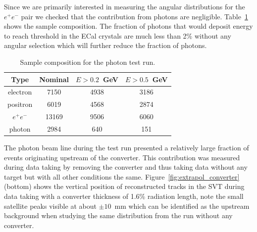 
Since we are primarily interested in measuring the angular 
distributions for the $e^+e^-$ pair we checked that the contribution from photons are negligible. Table~\ref{tab:sample_composition} shows the sample composition. The fraction 
of photons that would deposit energy to reach threshold in the ECal crystals are much less than 2\% without any angular selection which will further reduce the fraction of photons. 
\begin{table}[]
\centering
\begin{tabular}{c|c|c|c}
Type & Nominal & $E>0.2$~GeV & $E>0.5$~GeV \\
\hline
electron & 7150 & 4938 & 3186 \\
positron & 6019 & 4568 & 2874 \\
$e^+e^-$ & 13169 & 9506 & 6060 \\
photon & 2984 & 640 & 151 \\
\hline
\end{tabular}
\caption{Sample composition for the photon test run.}
\label{tab:sample_composition}
\end{table}

The photon beam line during the test run presented a relatively large fraction of events 
originating upstream of the converter. This contribution was measured during data taking by 
removing the converter and thus taking data without any target but with all other conditions 
the same. Figure~\ref{fig:extrapol_converter} (bottom) shows the vertical position of 
reconstructed tracks in the SVT during data taking with a converter thickness of 
1.6\% radiation length, note the small satellite peaks visible at about $\pm 10$~mm which 
can be identified as the upstream background when studying the same distribution from the 
run without any converter. 

